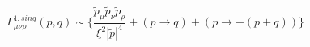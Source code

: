 \begin{equation} \Gamma^{1, sing}_{\mu \nu \rho}(p,q) \sim \{ 
\frac{\tilde{p}_{\mu} \tilde{p}_{\nu} 
 \tilde{p}_{\rho}}{\xi^2|\tilde{p}|^4}+ (p \rightarrow q)+(p \rightarrow 
 -(p+q)) \} \label{25} 
 \end{equation}

